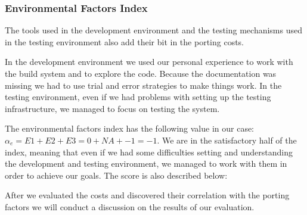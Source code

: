\subsubsection{Environmental Factors Index}

The tools used in the development environment and the testing mechanisms used in
the testing environment also add their bit in the porting costs.

In the development environment we used our personal experience to work with the
build system and to explore the code. Because the documentation was missing we
had to use trial and error strategies to make things work. In the testing
environment, even if we had problems with setting up the testing infrastructure,
we managed to focus on testing the system.

The environmental factors index has the following value in our case: $\alpha_e =
E1 + E2 + E3 = 0 + NA + -1 = -1$. We are in the satisfactory half of the index,
meaning that even if we had some difficulties setting and understanding the
development and testing environment, we managed to work with them in order to
achieve our goals. The score is also described below:


After we evaluated the costs and discovered their correlation with the porting
factors we will conduct a discussion on the results of our evaluation.
